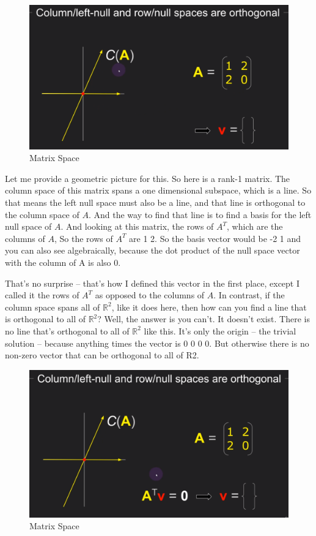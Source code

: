 \documentclass[fleqn,10pt]{olplainarticle}
\theoremstyle{definition}
\theoremstyle{remark}
\begin{document}
\begin{figure}[ht]
	\centering
	\includegraphics[width=0.6\linewidth]{images/matrix-space-29.png}
	\caption{Matrix Space}
	\label{fig:matrix_space_29}
\end{figure}

Let me provide a geometric picture for this. So here is a rank-1 matrix. The column space of this matrix spans a one dimensional subspace, which is a line. So that means the left null space must also be a line, and that line is orthogonal to the column space of $A$. And the way to find that line is to find a basis for the left null space of $A$. And looking at this matrix, the rows of $A^T$, which are the columns of $A$, So the rows of $A^T$ are 1 2. So the basis vector would be -2 1 and you can also see algebraically, because the dot product of the null space vector with the column of A is also 0.

That's no surprise -- that's how I defined this vector in the first place, except I called it the rows of $A^T$ as opposed to the columns of $A$. In contrast, if the column space spans all of $\mathbb{R}^2$, like it does here, then how can you find a line that is orthogonal to all of $\mathbb{R}^2$? Well, the answer is you can't. It doesn't exist. There is no line that's orthogonal to all of $\mathbb{R}^2$ like this. It's only the origin -- the trivial solution -- because anything times the vector is 0 0 0 0. But otherwise there is no non-zero vector that can be orthogonal to all of R2.

\begin{figure}[ht]
	\centering
	\includegraphics[width=0.6\linewidth]{images/matrix-space-30.png}
	\caption{Matrix Space}
	\label{fig:matrix_space_30}
\end{figure}
\end{document}
